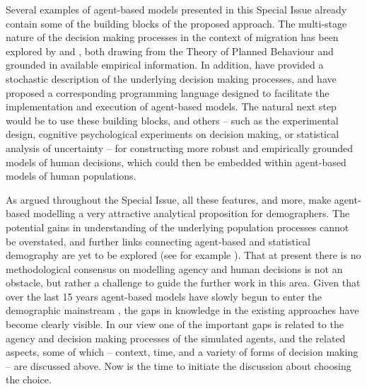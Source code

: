 \documentclass{article}
\begin{document}
Several examples of agent-based models presented in this Special Issue already contain some of the building blocks of the proposed approach. The multi-stage nature of the decision making processes in the context of migration has been explored by \citet{Willekens2017} and \citet{Kley2017}, both drawing from the Theory of Planned Behaviour \citep{Ajzen1991} and grounded in available empirical information. In addition, \citet{Warnke2017} have provided a stochastic description of the underlying decision making processes, and have proposed a corresponding programming language designed to facilitate the implementation and execution of agent-based models. The natural next step would be to use these building blocks, and others -- such as the experimental design, cognitive psychological experiments on decision making, or statistical analysis of uncertainty -- for constructing more robust and empirically grounded models of human decisions, which could then be embedded within agent-based models of human populations. 

As argued throughout the Special Issue, all these features, and more, make agent-based modelling a very attractive analytical proposition for demographers. The potential gains in understanding of the underlying population processes cannot be overstated, and further links connecting agent-based and statistical demography are yet to be explored (see for example \citet{Bijak2016}). That at present there is no methodological consensus on modelling agency and human decisions is not an obstacle, but rather a challenge to guide the further work in this area. Given that over the last 15 years agent-based models have slowly begun to enter the demographic mainstream \citep{Billari2003,VanBavel2016}, the gaps in knowledge in the existing approaches have become clearly visible. In our view one of the important gaps is related to the agency and decision making processes of the simulated agents, and the related aspects, some of which – context, time, and a variety of forms of decision making – are discussed above. Now is the time to initiate the discussion about choosing the choice. 



\end{document}
